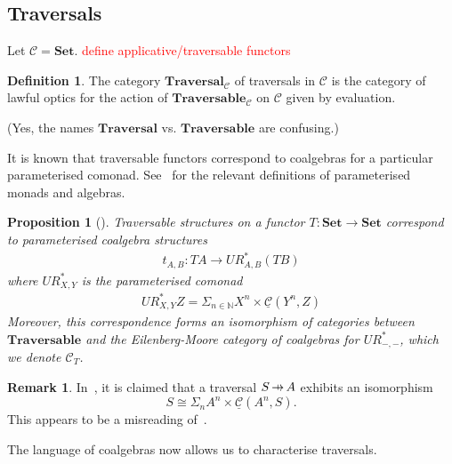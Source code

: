 \documentclass[11pt,a4paper]{article}
\theoremstyle{plain}
\newtheorem{proposition}[theorem]{Proposition}
\theoremstyle{definition}
\newtheorem{definition}[theorem]{Definition}
\newtheorem{remark}[theorem]{Remark}
\newcommand{\C}{\mathscr{C}}
\newcommand{\homC}{\underline{\C}}
\newcommand{\bN}{\mathbb{N}}
\newcommand{\Set}{\mathbf{Set}}
\newcommand{\Traversable}{\mathbf{Traversable}}
\newcommand{\Traversal}{\mathbf{Traversal}}
\newcommand{\hto}{\ensuremath{\,\mathaccent\shortmid\rightarrow\,}}
\newcommand{\todo}[1]{\textcolor{red}{\small #1}}
\begin{document}
\subsection{Traversals}
Let $\C = \Set$. \todo{define applicative/traversable functors}

\begin{definition}
The category $\Traversal_\C$ of traversals in $\C$ is the category of lawful optics for the action of $\Traversable_\C$ on $\C$ given by evaluation.
\end{definition}

(Yes, the names $\Traversal$ vs\@. $\Traversable$ are confusing.)

It is known that traversable functors correspond to coalgebras for a particular parameterised comonad. See~\cite{AlgebrasForParameterisedMonads} for the relevant definitions of parameterised monads and algebras.

\begin{proposition}[{\cite[Theorem 4.10, Proposition 5.4]{SecondOrderFunctionals}}]
Traversable structures on a functor $T : \Set \to \Set$ correspond to parameterised coalgebra structures
\begin{align*}
t_{A, B} : TA \to UR^*_{A, B}(T B)
\end{align*} 
where $UR^*_{X,Y}$ is the parameterised comonad
\begin{align*}
UR^*_{X, Y} Z = \Sigma_{n\in \bN} X^n \times \homC(Y^n,Z)
\end{align*}
Moreover, this correspondence forms an isomorphism of categories between $\Traversable$ and the Eilenberg-Moore category of coalgebras for $UR^*_{-, -}$, which we denote $\C_T$.
\end{proposition}

\begin{remark}
In~\cite[Section 2.3]{ProfunctorOptics}, it is claimed that a traversal $S \hto A$ exhibits an isomorphism \[S \cong \Sigma_n A^n \times \homC(A^n,S).\] This appears to be a misreading of~\cite[Proposition 5.4]{SecondOrderFunctionals}.
\end{remark}

The language of coalgebras now allows us to characterise traversals.
\end{document}
